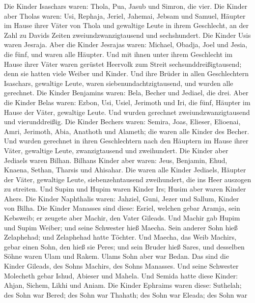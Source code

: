  Die Kinder Isaschars waren: Thola, Pua, Jasub und Simron,
die vier.  Die Kinder aber Tholas waren: Usi, Rephaja,
Jeriel, Jahemai, Jebsam und Samuel, Häupter im Hause ihrer Väter von
Thola und gewaltige Leute in ihrem Geschlecht, an der Zahl zu Davids
Zeiten zweiundzwanzigtausend und sechshundert.  Die Kinder
Usis waren Jesraja. Aber die Kinder Jesrajas waren: Michael, Obadja,
Joel und Jesia, die fünf, und waren alle Häupter.  Und mit
ihnen unter ihrem Geschlecht im Hause ihrer Väter waren gerüstet
Heervolk zum Streit sechsunddreißigtausend; denn sie hatten viele Weiber
und Kinder.  Und ihre Brüder in allen Geschlechtern
Isaschars, gewaltige Leute, waren siebenundachtzigtausend, und wurden
alle gerechnet.  Die Kinder Benjamins waren: Bela, Becher
und Jediael, die drei.  Aber die Kinder Belas waren: Ezbon,
Usi, Usiel, Jerimoth und Iri, die fünf, Häupter im Hause der Väter,
gewaltige Leute. Und wurden gerechnet zweiundzwanzigtausend und
vierunddreißig.  Die Kinder Bechers waren: Semira, Joas,
Elieser, Elioenai, Amri, Jerimoth, Abia, Anathoth und Alameth; die waren
alle Kinder des Becher.  Und wurden gerechnet in ihren
Geschlechtern nach den Häuptern im Hause ihrer Väter, gewaltige Leute,
zwanzigtausend und zweihundert.  Die Kinder aber Jediaels
waren Bilhan. Bilhans Kinder aber waren: Jeus, Benjamin, Ehud, Knaena,
Sethan, Tharsis und Ahisahar.  Die waren alle Kinder
Jediaels, Häupter der Väter, gewaltige Leute, siebenzehntausend
zweihundert, die ins Heer auszogen zu streiten.  Und Supim
und Hupim waren Kinder Irs; Husim aber waren Kinder Ahers. 
Die Kinder Naphthalis waren: Jahziel, Guni, Jezer und Sallum, Kinder von
Bilha.  Die Kinder Manasses sind diese: Esriel, welchen
gebar Aramja, sein Kebsweib; er zeugete aber Machir, den Vater Gileads.
 Und Machir gab Hupim und Supim Weiber; und seine Schwester
hieß Maecha. Sein anderer Sohn hieß Zelaphehad; und Zelaphehad hatte
Töchter.  Und Maecha, das Weib Machirs, gebar einen Sohn,
den hieß sie Peres; und sein Bruder hieß Sares, und desselben Söhne
waren Ulam und Rakem.  Ulams Sohn aber war Bedan. Das sind
die Kinder Gileads, des Sohns Machirs, des Sohns Manasses. 
Und seine Schwester Molecheth gebar Ishud, Abieser und Mahela.
 Und Semida hatte diese Kinder: Ahjan, Sichem, Likhi und
Aniam.  Die Kinder Ephraims waren diese: Suthelah; des Sohn
war Bered; des Sohn war Thahath; des Sohn war Eleada; des Sohn war
